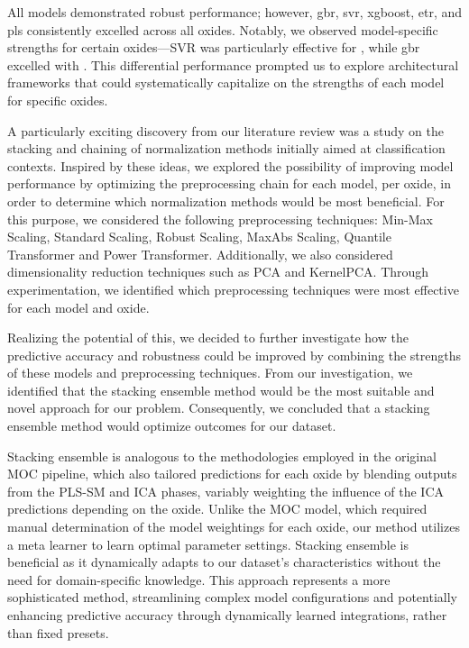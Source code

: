 All models demonstrated robust performance; however, \gls{gbr}, \gls{svr}, \gls{xgboost}, \gls{etr}, and \gls{pls} consistently excelled across all oxides. 
Notably, we observed model-specific strengths for certain oxides—SVR was particularly effective for , while \gls{gbr} excelled with . 
This differential performance prompted us to explore architectural frameworks that could systematically capitalize on the strengths of each model for specific oxides.

A particularly exciting discovery from our literature review was a study on the stacking and chaining of normalization methods initially aimed at classification contexts. 
Inspired by these ideas, we explored the possibility of improving model performance by optimizing the preprocessing chain for each model, per oxide, in order to determine which normalization methods would be most beneficial.
For this purpose, we considered the following preprocessing techniques: Min-Max Scaling, Standard Scaling, Robust Scaling, MaxAbs Scaling, Quantile Transformer and Power Transformer. 
Additionally, we also considered dimensionality reduction techniques such as PCA and KernelPCA.
Through experimentation, we identified which preprocessing techniques were most effective for each model and oxide. 

Realizing the potential of this, we decided to further investigate how the predictive accuracy and robustness could be improved by combining the strengths of these models and preprocessing techniques.
From our investigation, we identified that the stacking ensemble method would be the most suitable and novel approach for our problem.
Consequently, we concluded that a stacking ensemble method would optimize outcomes for our dataset. 

Stacking ensemble is analogous to the methodologies employed in the original MOC pipeline, which also tailored predictions for each oxide by blending outputs from the PLS-SM and ICA phases, variably weighting the influence of the ICA predictions depending on the oxide.
Unlike the MOC model, which required manual determination of the model weightings for each oxide, our method utilizes a meta learner to learn optimal parameter settings. 
Stacking ensemble is beneficial as it dynamically adapts to our dataset's characteristics without the need for domain-specific knowledge.
This approach represents a more sophisticated method, streamlining complex model configurations and potentially enhancing predictive accuracy through dynamically learned integrations, rather than fixed presets.

